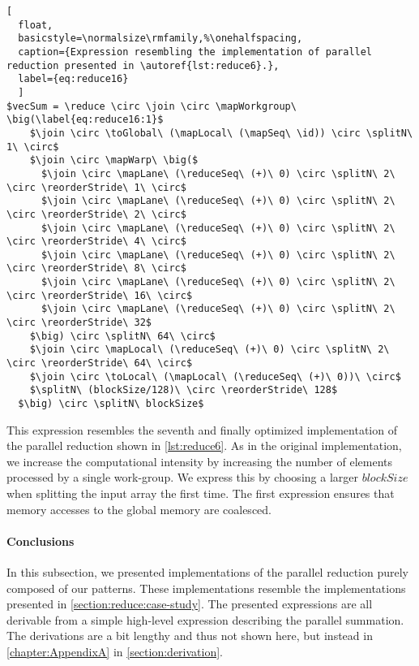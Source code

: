 \begin{lstlisting}[
  float,
  basicstyle=\normalsize\rmfamily,%\onehalfspacing,
  caption={Expression resembling the implementation of parallel reduction presented in \autoref{lst:reduce6}.},
  label={eq:reduce16}
  ]
$vecSum = \reduce \circ \join \circ \mapWorkgroup\ \big(\label{eq:reduce16:1}$
    $\join \circ \toGlobal\ (\mapLocal\ (\mapSeq\ \id)) \circ \splitN\ 1\ \circ$
    $\join \circ \mapWarp\ \big($
      $\join \circ \mapLane\ (\reduceSeq\ (+)\ 0) \circ \splitN\ 2\ \circ \reorderStride\ 1\ \circ$
      $\join \circ \mapLane\ (\reduceSeq\ (+)\ 0) \circ \splitN\ 2\ \circ \reorderStride\ 2\ \circ$
      $\join \circ \mapLane\ (\reduceSeq\ (+)\ 0) \circ \splitN\ 2\ \circ \reorderStride\ 4\ \circ$
      $\join \circ \mapLane\ (\reduceSeq\ (+)\ 0) \circ \splitN\ 2\ \circ \reorderStride\ 8\ \circ$
      $\join \circ \mapLane\ (\reduceSeq\ (+)\ 0) \circ \splitN\ 2\ \circ \reorderStride\ 16\ \circ$
      $\join \circ \mapLane\ (\reduceSeq\ (+)\ 0) \circ \splitN\ 2\ \circ \reorderStride\ 32$
    $\big) \circ \splitN\ 64\ \circ$
    $\join \circ \mapLocal\ (\reduceSeq\ (+)\ 0) \circ \splitN\ 2\ \circ \reorderStride\ 64\ \circ$
    $\join \circ \toLocal\ (\mapLocal\ (\reduceSeq\ (+)\ 0))\ \circ$
    $\splitN\ (blockSize/128)\ \circ \reorderStride\ 128$
  $\big) \circ \splitN\ blockSize$
\end{lstlisting}
%
This expression resembles the seventh and finally optimized implementation of the parallel reduction shown in \autoref{lst:reduce6}.
As in the original \OpenCL implementation, we increase the computational intensity by increasing the number of elements processed by a single work-group.
We express this by choosing a larger $blockSize$ when splitting the input array the first time.
The first \reorderStride expression ensures that memory accesses to the global memory are coalesced.


\paragraph{Conclusions}
In this subsection, we presented implementations of the parallel reduction purely composed of our patterns.
These implementations resemble the \OpenCL implementations presented in \autoref{section:reduce:case-study}.
The presented expressions are all derivable from a simple high-level expression describing the parallel summation.
The derivations are a bit lengthy and thus not shown here, but instead in \autoref{chapter:AppendixA} in \autoref{section:derivation}.

